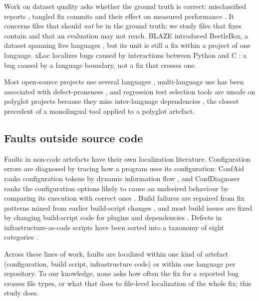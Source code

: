 \documentclass[a4paper,fleqn]{cas-dc}
\begin{document}
Work on dataset quality asks
whether the ground truth is correct: misclassified reports
\citep{herzig2013its}, tangled fix commits \citep{herzig2013impact} and their
effect on measured performance \citep{kochhar2014potential}. It concerns files
that should \emph{not} be in the ground truth; we study files that fixes
contain and that an evaluation may not reach. BLAZE introduced BeetleBox, a
dataset spanning five languages \citep{chakraborty2025blaze}, but its unit is
still a fix within a project of one language. xLoc localizes bugs caused by
interactions between Python and C \citep{yang2024xloc}: a bug caused by a
language boundary, not a fix that crosses one.

Most open-source projects use
several languages \citep{mayer2015empirical}, multi-language use has been
associated with defect-proneness \citep{kochhar2016large}, and regression test
selection tools are unsafe on polyglot projects because they miss
inter-language dependencies \citep{celik2017rtslinux}, the closest precedent
of a monolingual tool applied to a polyglot artefact.

\subsection{Faults outside source code}

Faults in non-code artefacts have their own localization literature.
Configuration errors are diagnosed by tracing how a program uses its
configuration: ConfAid ranks configuration tokens by dynamic information flow
\citep{attariyan2010confaid}, and ConfDiagnoser ranks the configuration options
likely to cause an undesired behaviour by comparing its execution with correct
ones \citep{zhang2013confdiagnoser}. Build failures are repaired from fix
patterns mined from earlier build-script changes \citep{hassan2018hirebuild},
and most build issues are fixed by changing build-script code for plugins and
dependencies \citep{lou2020buildissue}. Defects in infrastructure-as-code
scripts have been sorted into a taxonomy of eight categories
\citep{rahman2020gang}.

Across these lines of work, faults are localized within one kind of artefact
(configuration, build script, infrastructure code) or within one language per
repository. To our knowledge, none asks how often the fix for a reported bug
crosses file types,
or what that does to file-level localization of the whole fix; this study
does.

\end{document}
